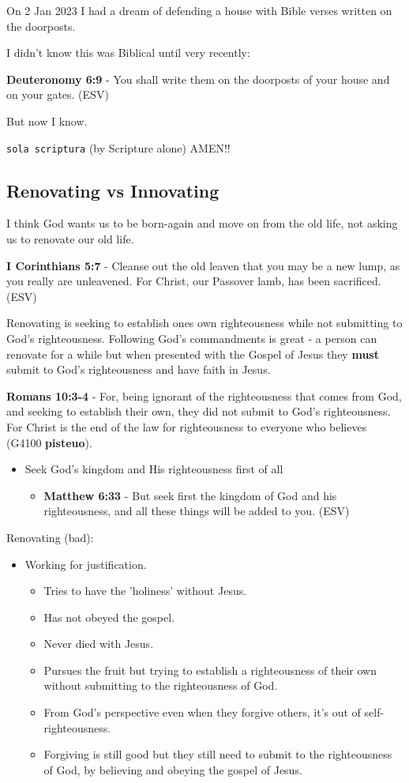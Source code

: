 \documentclass[11pt]{article}
\begin{document}
On 2 Jan 2023 I had a dream of defending a house with Bible verses written
on the doorposts.

I didn't know this was Biblical until very recently:

\textbf{Deuteronomy 6:9} -  You shall write them on the doorposts of your house and on your gates.  (ESV)

But now I know.

\texttt{sola scriptura} (by Scripture alone) AMEN!!

\subsection{Renovating vs Innovating}
\label{sec:org985c96f}
I think God wants us to be born-again and move on from the old life,
not asking us to renovate our old life.

\textbf{I Corinthians 5:7} - Cleanse out the old leaven that you may be a new lump, as you really are unleavened. For Christ, our Passover lamb, has been sacrificed. (ESV)

Renovating is seeking to establish ones own righteousness while not submitting to God's righteousness.
Following God's commandments is great - a person can renovate for a while but when presented with the Gospel of Jesus they \textbf{must} submit to God's righteousness and have faith in Jesus.

\textbf{Romans 10:3-4} - For, being ignorant of the righteousness that comes from God, and seeking to establish their own, they did not submit to God's righteousness. For Christ is the end of the law for righteousness to everyone who believes (G4100 \textbf{pisteuo}).

\begin{itemize}
\item Seek God's kingdom and His righteousness first of all
\begin{itemize}
\item \textbf{Matthew 6:33} - But seek first the kingdom of God and his righteousness, and all these things will be added to you. (ESV)
\end{itemize}
\end{itemize}

Renovating (bad):
\begin{itemize}
\item Working for justification.
\begin{itemize}
\item Tries to have the 'holiness' without Jesus.
\item Has not obeyed the gospel.
\item Never died with Jesus.
\item Pursues the fruit but trying to establish a righteousness of their own without submitting to the righteousness of God.
\item From God's perspective even when they forgive others, it's out of self-righteousness.
\item Forgiving is still good but they still need to submit to the righteousness of God, by believing and obeying the gospel of Jesus.
\end{itemize}
\end{itemize}
\end{document}
